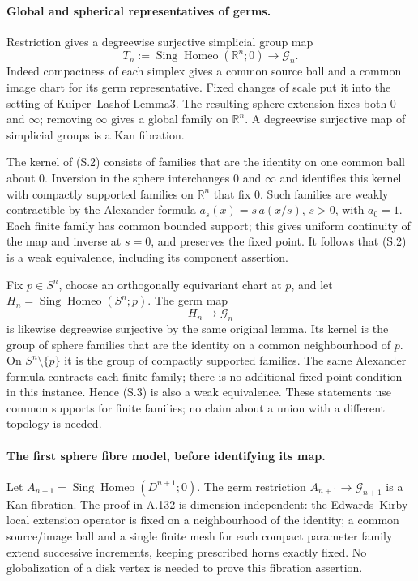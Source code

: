 \paragraph{Global and spherical representatives of germs.}
Restriction gives a degreewise surjective simplicial group map
\[
 T_n:=\operatorname{Sing}\operatorname{Homeo}(\mathbb R^n;0)
        \longrightarrow\mathcal G_n.                  \tag{S.2}
\]
Indeed compactness of each simplex gives a common source ball and
a common image chart for its germ representative. Fixed changes of
scale put it into the setting of Kuiper--Lashof Lemma3. The resulting
sphere extension fixes both $0$ and $\infty$; removing $\infty$
gives a global family on $\mathbb R^n$. A degreewise surjective
map of simplicial groups is a Kan fibration.

The kernel of (S.2) consists of families that are the identity on
one common ball about $0$. Inversion in the sphere interchanges
$0$ and $\infty$ and identifies this kernel with compactly
supported families on $\mathbb R^n$ that fix $0$. Such families
are weakly contractible by the Alexander formula
$a_s(x)=s\,a(x/s)$, $s>0$, with $a_0=1$.
Each finite family has common bounded support; this gives uniform
continuity of the map and inverse at $s=0$, and preserves the fixed
point. It follows that (S.2) is a weak equivalence, including its
component assertion.

Fix $p\in S^n$, choose an orthogonally equivariant chart at $p$,
and let $H_n=\operatorname{Sing}\operatorname{Homeo}(S^n;p)$.
The germ map
\[
                        H_n\longrightarrow\mathcal G_n
                                                               \tag{S.3}
\]
is likewise degreewise surjective by the same original lemma.
Its kernel is the group of sphere families that are the identity
on a common neighbourhood of $p$. On $S^n\setminus\{p\}$ it is
the group of compactly supported families. The same Alexander
formula contracts each finite family; there is no additional fixed
point condition in this instance. Hence (S.3) is also a weak
equivalence. These statements use common supports for finite
families; no claim about a union with a different topology is needed.

\paragraph{The first sphere fibre model, before identifying its map.}
Let $A_{n+1}=\operatorname{Sing}\operatorname{Homeo}(D^{n+1};0)$.
The germ restriction
$A_{n+1}\to\mathcal G_{n+1}$ is a Kan fibration. The proof in
A.132 is dimension-independent: the Edwards--Kirby local extension
operator is fixed on a neighbourhood of the identity; a common
source/image ball and a single finite mesh for each compact
parameter family extend successive increments, keeping prescribed
horns exactly fixed. No globalization of a disk vertex is needed
to prove this fibration assertion.


